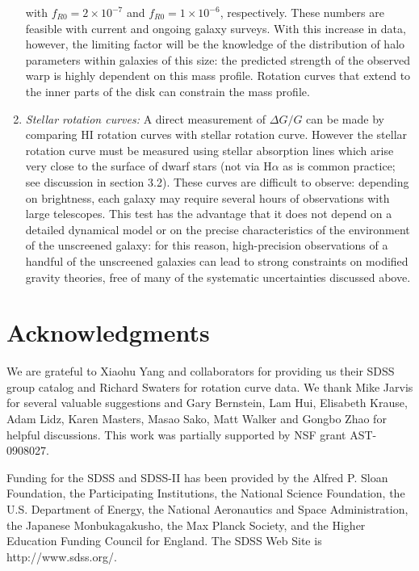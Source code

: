 \documentclass[useAMS,usenatbib,twocolumn]{mn2e}
\newcommand{\ha}{H$\alpha$}
\begin{document}
\begin{enumerate}
  with $f_{R0} = 2\times10^{-7}$ and $f_{R0} = 1\times10^{-6}$, respectively.
  These numbers are feasible with  current and ongoing galaxy surveys.
  With this increase in data, however, the limiting factor will be the
  knowledge of the distribution of halo parameters within galaxies of this
  size: the predicted strength of the observed warp is highly dependent on
  this mass profile. Rotation curves that extend to the inner parts of the disk
can
  constrain the mass profile. 
\item {\it Stellar rotation curves: }
  A direct measurement of $\Delta G/G$ can be made by
  comparing HI rotation curves with stellar rotation curve. However 
  the stellar rotation curve must be measured using stellar absorption
  lines which arise very close to the surface of dwarf stars (not via 
  \ha{} as is common practice; see discussion in section 3.2).  These curves
  are difficult to observe: depending on brightness, each galaxy may require
  several hours of observations with large telescopes. This test
  has the advantage that it does not depend on a detailed dynamical model
  or on the precise characteristics of the environment of the unscreened
  galaxy: for this reason, high-precision observations of
  a handful of the unscreened galaxies can lead to strong constraints on
  modified gravity theories, free of many of the systematic uncertainties
  discussed above.
\end{enumerate}


\section{Acknowledgments}
We are grateful to Xiaohu Yang and collaborators 
for providing us their SDSS group catalog and Richard Swaters for 
rotation curve data. 
We thank Mike Jarvis for several valuable suggestions and Gary 
Bernstein, Lam Hui, 
Elisabeth Krause, Adam Lidz, Karen Masters, Masao Sako, 
Matt Walker and Gongbo Zhao for helpful
discussions. This work was partially supported by NSF grant AST-0908027.

Funding for the SDSS and SDSS-II has been provided by the Alfred P. Sloan
Foundation, the Participating Institutions, the National Science Foundation,
the U.S. Department of Energy, the National Aeronautics and Space
Administration, the Japanese Monbukagakusho, the Max Planck Society, and the
Higher Education Funding Council for England. The SDSS Web Site is
http://www.sdss.org/.
\end{document}
